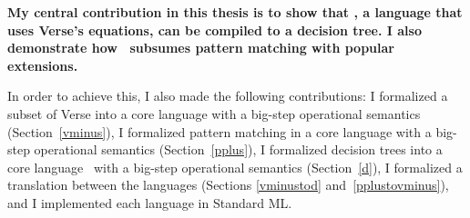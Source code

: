 \documentclass[manuscript,screen,review, 12pt, nonacm]{acmart}
\begin{document}
\bf{My central contribution in this thesis} is to show that \VMinus, a language
that uses Verse's equations, can be compiled to a decision tree. I also
demonstrate how \VMinus\ subsumes pattern matching with popular extensions. 

In order to achieve this, I also made the following contributions: I formalized
a subset of Verse into a core language \VMinus with a big-step operational
semantics (Section~\ref{vminus}), I formalized pattern matching in a core
language \PPlus with a big-step operational semantics (Section~\ref{pplus}), I
formalized decision trees into a core language \D\ with a big-step operational
semantics (Section~\ref{d}), I formalized a translation between the languages
(Sections \ref{vminustod} and~\ref{pplustovminus}), and I implemented each
language in Standard ML. 
\end{document}
